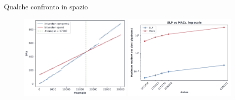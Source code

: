 \documentclass[]{beamer}
\begin{document}
\begin{frame}{Qualche confronto in spazio}
  \begin{figure}[H]
    \centering
    \includegraphics[width=0.49\textwidth]{img/bv_vs_iv.pdf}
    \includegraphics[width=0.49\textwidth]{img/slp_vs_macs_log.pdf}

  \end{figure}
\end{frame}
\end{document}
